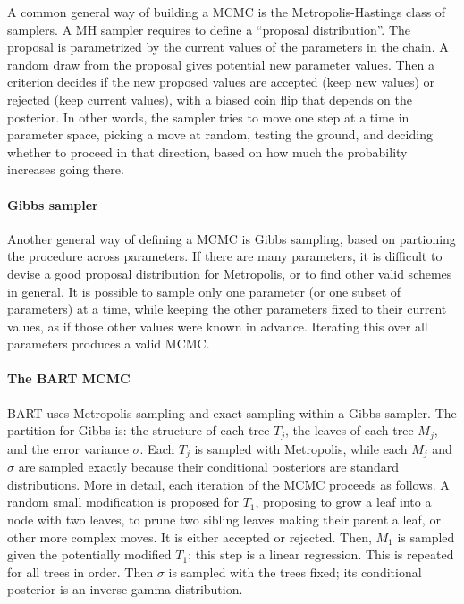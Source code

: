 \documentclass{article}
\begin{document}
    A common general way of building a MCMC is the Metropolis-Hastings class of samplers. A MH sampler requires to define a ``proposal distribution''. The proposal is parametrized by the current values of the parameters in the chain. A random draw from the proposal gives potential new parameter values. Then a criterion decides if the new proposed values are accepted (keep new values) or rejected (keep current values), with a biased coin flip that depends on the posterior. In other words, the sampler tries to move one step at a time in parameter space, picking a move at random, testing the ground, and deciding whether to proceed in that direction, based on how much the probability increases going there.

    \paragraph{Gibbs sampler}

    Another general way of defining a MCMC is Gibbs sampling, based on partioning the procedure across parameters. If there are many parameters, it is difficult to devise a good proposal distribution for Metropolis, or to find other valid schemes in general. It is possible to sample only one parameter (or one subset of parameters) at a time, while keeping the other parameters fixed to their current values, as if those other values were known in advance. Iterating this over all parameters produces a valid MCMC.

    \paragraph{The BART MCMC}

    BART uses Metropolis sampling and exact sampling within a Gibbs sampler. The partition for Gibbs is: the structure of each tree $T_j$, the leaves of each tree $M_j$, and the error variance $\sigma$. Each $T_j$ is sampled with Metropolis, while each $M_j$ and $\sigma$ are sampled exactly because their conditional posteriors are standard distributions. More in detail, each iteration of the MCMC proceeds as follows. A random small modification is proposed for $T_1$, proposing to grow a leaf into a node with two leaves, to prune two sibling leaves making their parent a leaf, or other more complex moves. It is either accepted or rejected. Then, $M_1$ is sampled given the potentially modified $T_1$; this step is a linear regression. This is repeated for all trees in order. Then $\sigma$ is sampled with the trees fixed; its conditional posterior is an inverse gamma distribution.
\end{document}
